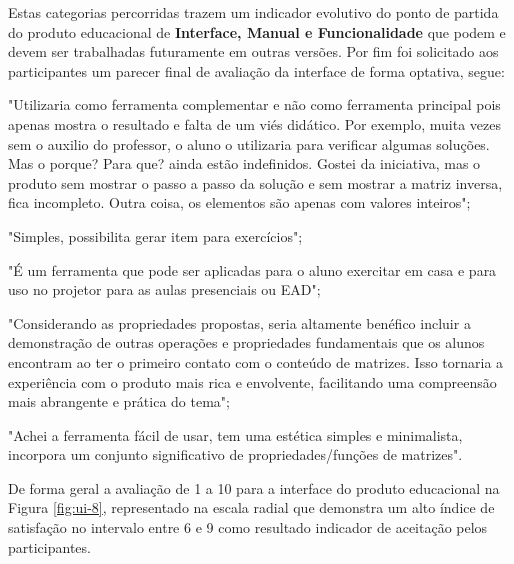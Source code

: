 Estas categorias percorridas trazem um indicador evolutivo do ponto de partida do produto educacional de \textbf{Interface, Manual e Funcionalidade} que podem e devem ser trabalhadas futuramente em outras versões. Por fim foi solicitado aos participantes um parecer final de avaliação da interface de forma optativa, segue:

\begin{citacao}

\item "Utilizaria como ferramenta complementar e não como ferramenta principal pois apenas mostra o resultado e falta de um viés didático. Por exemplo, muita vezes sem o auxilio do professor, o aluno o utilizaria para verificar algumas soluções. Mas o porque? Para que? ainda estão indefinidos. Gostei da iniciativa, mas o produto sem mostrar o passo a passo da solução e sem mostrar a matriz inversa, fica incompleto. Outra coisa, os elementos são apenas com valores inteiros";

\item "Simples, possibilita gerar item para exercícios";

\item "É um ferramenta que pode ser aplicadas para o aluno exercitar em casa e para uso no projetor para as aulas presenciais ou EAD";

\item "Considerando as propriedades propostas, seria altamente benéfico incluir a demonstração de outras operações e propriedades fundamentais que os alunos encontram ao ter o primeiro contato com o conteúdo de matrizes. Isso tornaria a experiência com o produto mais rica e envolvente, facilitando uma compreensão mais abrangente e prática do tema";

\item "Achei a ferramenta fácil de usar, tem uma estética simples e minimalista, incorpora um conjunto significativo de propriedades/funções de matrizes".

\end{citacao}

De forma geral a avaliação de 1 a 10 para a interface do produto educacional na Figura \ref{fig:ui-8}, representado na escala radial que demonstra um alto índice de satisfação no intervalo entre 6 e 9 como resultado indicador de aceitação pelos participantes.

